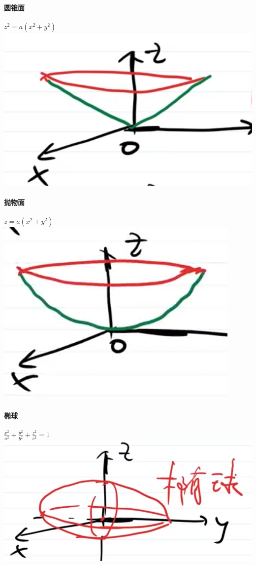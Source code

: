 \documentclass{article}
\begin{document}
\begin{flushleft}
	\paragraph{圆锥面}
	$z^2=a(x^2+y^2)$\\
	\includegraphics[scale=0.5]{yzm.png}
	
	\paragraph{抛物面}
	$z=a(x^2+y^2)$\\
	\includegraphics[scale=0.5]{pwm.png}
	
	\paragraph{椭球}
	$\frac{x^2}{a^2}+\frac{y^2}{b^2}+\frac{z^2}{c^2}=1$\\
	\includegraphics[scale=0.5]{tq.png}
	

\end{flushleft}
\end{document}
